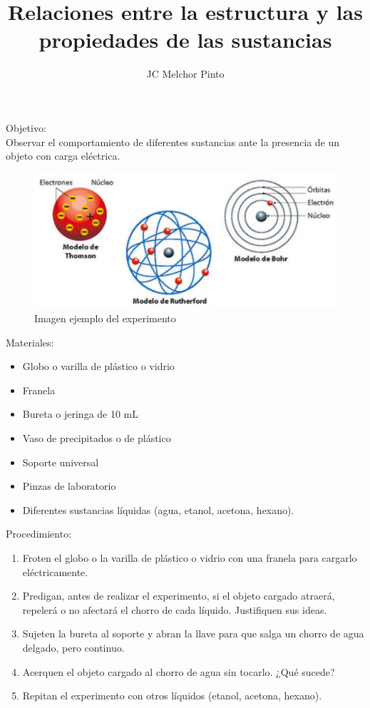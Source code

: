 \documentclass[12pt,addpoints,answers]{guia}
\title{Relaciones entre la estructura y las propiedades de las sustancias}
\author{JC Melchor Pinto}
\begin{document}
\INFO%
\begin{multicols}{2}
    
\end{multicols}
\begin{opening}
    Objetivo:\\ Observar el comportamiento de diferentes sustancias ante la presencia de un objeto
    con carga eléctrica.

    \begin{minipage}{0.3\textwidth}
        \begin{figure}[H]
            \includegraphics[width=0.9\linewidth]{../images/atomicsmodels}
            \caption{Imagen ejemplo del experimento}
            \label{fig:atomicsmodels}
        \end{figure}

    \end{minipage}\hfill
    \begin{minipage}{0.6\textwidth}
        Materiales:
        \begin{itemize}
            \item Globo o varilla de plástico o vidrio
            \item Franela
            \item Bureta o jeringa de 10 mL
            \item Vaso de precipitados o de plástico
            \item Soporte universal
            \item Pinzas de laboratorio
            \item Diferentes sustancias líquidas (agua, etanol, acetona, hexano).
        \end{itemize}

        Procedimiento:
        \begin{enumerate}
            \item Froten el globo o la varilla de plástico o vidrio con una franela para cargarlo eléctricamente.
            \item Predigan, antes de realizar el experimento, si el objeto cargado atraerá, repelerá o no afectará el chorro de cada líquido. Justifiquen sus ideas.
            \item Sujeten la bureta al soporte y abran la llave para que salga un chorro de agua delgado, pero continuo.
            \item Acerquen el objeto cargado al chorro de agua sin tocarlo. ¿Qué sucede?
            \item Repitan el experimento con otros líquidos (etanol, acetona, hexano).
        \end{enumerate}


\end{minipage}
\end{opening}
\end{document}
